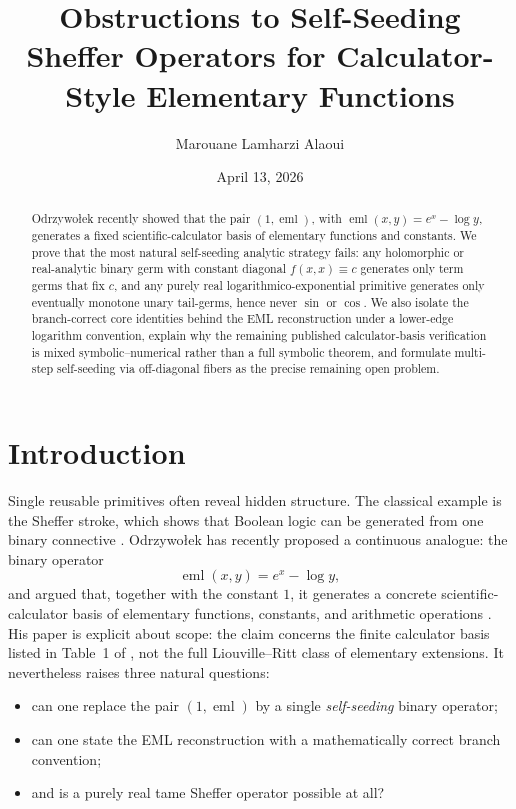 \documentclass[12pt]{amsart}
\title[Obstructions to self-seeding Sheffer operators]{Obstructions to Self-Seeding Sheffer Operators for Calculator-Style Elementary Functions}
\author{Marouane Lamharzi Alaoui}
\date{April 13, 2026}
\theoremstyle{remark}
\begin{document}
\begin{abstract}
Odrzywo\l{}ek recently showed that the pair $(1,\operatorname{eml})$, with $\operatorname{eml}(x,y)=e^x-\log y$, generates a fixed scientific-calculator basis of elementary functions and constants.  We prove that the most natural self-seeding analytic strategy fails: any holomorphic or real-analytic binary germ with constant diagonal $f(x,x)\equiv c$ generates only term germs that fix $c$, and any purely real logarithmico-exponential primitive generates only eventually monotone unary tail-germs, hence never $\sin$ or $\cos$.  We also isolate the branch-correct core identities behind the EML reconstruction under a lower-edge logarithm convention, explain why the remaining published calculator-basis verification is mixed symbolic--numerical rather than a full symbolic theorem, and formulate multi-step self-seeding via off-diagonal fibers as the precise remaining open problem.
\end{abstract}

\maketitle

\section{Introduction}

Single reusable primitives often reveal hidden structure.  The classical example is the Sheffer stroke, which shows that Boolean logic can be generated from one binary connective \cite{Sheffer1913}.  Odrzywo\l{}ek has recently proposed a continuous analogue: the binary operator
\begin{equation}\label{eq:eml}
\operatorname{eml}(x,y)=e^x-\log y,
\end{equation}
and argued that, together with the constant $1$, it generates a concrete scientific-calculator basis of elementary functions, constants, and arithmetic operations \cite{Odrzywolek2026}.  His paper is explicit about scope: the claim concerns the finite calculator basis listed in Table~1 of \cite{Odrzywolek2026}, not the full Liouville--Ritt class of elementary extensions.  It nevertheless raises three natural questions:
\begin{itemize}
    \item can one replace the pair $(1,\operatorname{eml})$ by a single \emph{self-seeding} binary operator;
    \item can one state the EML reconstruction with a mathematically correct branch convention;
    \item and is a purely real tame Sheffer operator possible at all?
\end{itemize}
\end{document}
